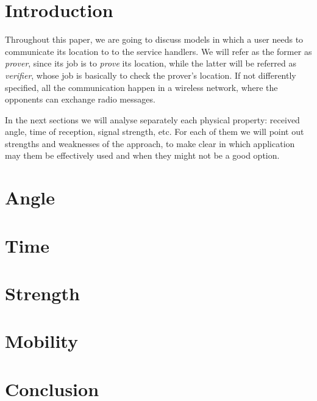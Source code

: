 \documentclass[conference]{IEEEtran}
\begin{document}
\section{Introduction}
Throughout this paper, we are going to discuss models in which a user needs to communicate its location to to the service handlers. We will refer as the former as \emph{prover}, since its job is to \emph{prove} its location, while the latter will be referred as \emph{verifier}, whose job is basically to check the prover's location. If not differently specified, all the communication happen in a wireless network, where the opponents can exchange radio messages.

In the next sections we will analyse separately each physical property: received angle, time of reception, signal strength, etc. For each of them we will point out strengths and weaknesses of the approach, to make clear in which application may them be effectively used and when they might not be a good option.

\section{Angle}


\section{Time}


\section{Strength}


\section{Mobility}


\section{Conclusion}
\end{document}
